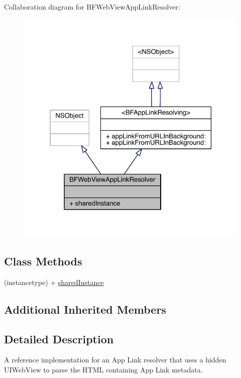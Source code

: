 Collaboration diagram for B\-F\-Web\-View\-App\-Link\-Resolver\-:
\nopagebreak
\begin{figure}[H]
\begin{center}
\leavevmode
\includegraphics[width=323pt]{interface_b_f_web_view_app_link_resolver__coll__graph}
\end{center}
\end{figure}
\subsection*{Class Methods}
\begin{DoxyCompactItemize}
\item 
(instancetype) + \hyperlink{interface_b_f_web_view_app_link_resolver_abc297691dfa1ec5dff07ccf50ebee915}{shared\-Instance}
\end{DoxyCompactItemize}
\subsection*{Additional Inherited Members}


\subsection{Detailed Description}
A reference implementation for an App Link resolver that uses a hidden U\-I\-Web\-View to parse the H\-T\-M\-L containing App Link metadata. 

